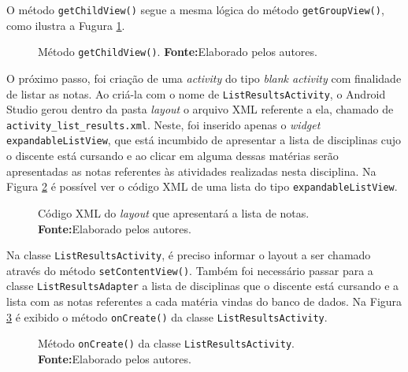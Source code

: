 	\pagebreak

	\par O método \texttt{getChildView()} segue a mesma lógica do método
\texttt{getGroupView()}, como ilustra a Fugura \ref{fig:app14}.

	\begin{figure}[h!] 
		
		\caption[Método getChildView()]{Método \texttt{getChildView()}.
		\textbf{Fonte:}Elaborado pelos autores.}
		\label{fig:app14}
	\end{figure}
	
	\par O próximo passo, foi criação de uma \textit{activity} do tipo
\textit{blank activity} com finalidade de listar as notas. Ao criá-la com o
nome de \texttt{ListResultsActivity}, o Android Studio gerou dentro da pasta
\textit{layout} o arquivo XML referente a ela, chamado de
\texttt{activity\_list\_results.xml}. Neste, foi inserido apenas o
\textit{widget} \texttt{expandableListView}, que está incumbido de apresentar
a lista de disciplinas cujo o discente está cursando e ao clicar em alguma
dessas matérias serão apresentadas as notas referentes às atividades
realizadas nesta disciplina. Na Figura \ref{fig:app15} é possível ver o código XML de uma
lista do tipo \texttt{expandableListView}.

	\begin{figure}[h!] 
		
		\caption[Código XML do layout que apresentará a lista de notas]{Código XML do
		\textit{layout} que apresentará a lista de notas.
		\textbf{Fonte:}Elaborado pelos autores.}
		\label{fig:app15}
	\end{figure}
	
	\pagebreak
	
	\par Na classe \texttt{ListResultsActivity}, é preciso informar o layout a ser
chamado através do método \texttt{setContentView()}. Também foi necessário
passar para a classe \texttt{ListResultsAdapter} a lista de disciplinas que o
discente está cursando e a lista com as notas referentes a cada matéria vindas
do banco de dados. Na Figura \ref{fig:app16} é exibido o método
\texttt{onCreate()} da classe \texttt{ListResultsActivity}. 
	
	
	\begin{figure}[h!] 
		
		\caption[ Método onCreate() da classe ListResultsActivity]{ Método
		\texttt{onCreate()} da classe \texttt{ListResultsActivity}.
		\textbf{Fonte:}Elaborado pelos autores.}
		\label{fig:app16}
	\end{figure}

